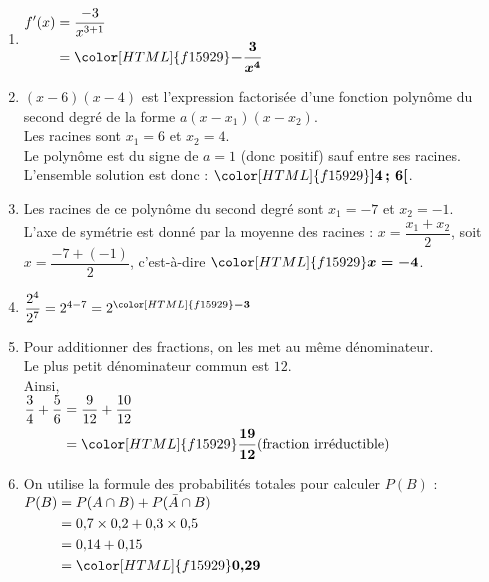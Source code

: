 \documentclass[a4paper,11pt,landscape,exos]{nsi} %
\begin{document}
\begin{multicols}{2}
\begin{enumerate}[]
\item  
    $\begin{aligned}
  f'(x)&=\dfrac{-3}{x^{3+1}}\\
  &={\color[HTML]{f15929}\boldsymbol{-\dfrac{3}{x^4}}}
  \end{aligned}$
\item $(x-6)(x-4)$ est l'expression factorisée d'une fonction polynôme du second degré de la forme $a(x-x_1)(x-x_2)$.\\
    Les racines sont $x_1=6$ et $x_2=4$. \\
    Le polynôme est du signe de $a=1$ (donc positif) sauf entre ses racines.\\
    L'ensemble solution est donc :  ${\color[HTML]{f15929}\boldsymbol{]4\,;\,6[}}$.   
     
\item Les racines de ce polynôme du second degré sont $x_1=-7$ et $x_2=-1$.\\
    L'axe de symétrie est donné par la moyenne des racines : $x=\dfrac{x_1+x_2}{2}$, soit $x=\dfrac{-7+(-1)}{2}$, c'est-à-dire ${\color[HTML]{f15929}\boldsymbol{x=-4}}$.
\item $\dfrac{2^4}{2^7}=2^{4-7}=2^{\color[HTML]{f15929}\boldsymbol{-3}}$

\item Pour additionner des fractions, on les met au même dénominateur.\\
  Le plus petit dénominateur commun est $12$.\\
             Ainsi, \\
           $\begin{aligned}
           \dfrac{3}{4} + \dfrac{5}{6}&=
            \dfrac{9}{12}+\dfrac{10}{12} \\
           &={\color[HTML]{f15929}\boldsymbol{\dfrac{19}{12}}}\text{(fraction irréductible)}
           \end{aligned}$
             
             
            
\item On utilise la formule des probabilités totales pour calculer $P(B)$ :\\
          $\begin{aligned}
          P(B)&=P(A\cap B)+P(\bar{A}\cap B)\\
          &=0{,}7\times 0{,}2+0{,}3\times 0{,}5\\
            &=0{,}14+0{,}15\\
&={\color[HTML]{f15929}\boldsymbol{0{,}29}}
          \end{aligned}$
      

\end{enumerate}
\end{multicols}
\end{document}
